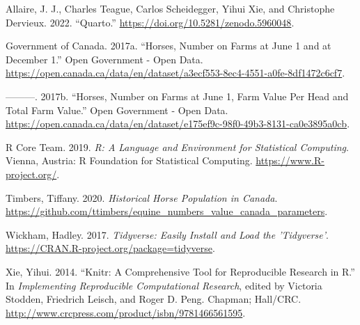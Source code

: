 \documentclass[
  letterpaper,
  DIV=11,
  numbers=noendperiod]{scrartcl}
\newlength{\cslhangindent}
\newenvironment{CSLReferences}[2] %
 {\begin{list}{}{%
  \setlength{\itemindent}{0pt}
  \setlength{\leftmargin}{0pt}
  \setlength{\parsep}{0pt}
  \ifodd #1
   \setlength{\leftmargin}{\cslhangindent}
   \setlength{\itemindent}{-1\cslhangindent}
  \fi
  \setlength{\itemsep}{#2\baselineskip}}}
 {\end{list}}
\begin{document}
\label{refs}
\begin{CSLReferences}{1}{0}
Allaire, J. J., Charles Teague, Carlos Scheidegger, Yihui Xie, and
Christophe Dervieux. 2022. {``{Quarto}.''}
\url{https://doi.org/10.5281/zenodo.5960048}.

Government of Canada. 2017a. {``Horses, Number on Farms at June 1 and at
December 1.''} Open Government - Open Data.
\url{https://open.canada.ca/data/en/dataset/a3ecf553-8ec4-4551-a0fe-8df1472c6cf7}.

---------. 2017b. {``Horses, Number on Farms at June 1, Farm Value Per
Head and Total Farm Value.''} Open Government - Open Data.
\url{https://open.canada.ca/data/en/dataset/e175ef9c-98f0-49b3-8131-ca0e3895a0cb}.

R Core Team. 2019. \emph{R: A Language and Environment for Statistical
Computing}. Vienna, Austria: R Foundation for Statistical Computing.
\url{https://www.R-project.org/}.

Timbers, Tiffany. 2020. \emph{Historical Horse Population in Canada}.
\url{https://github.com/ttimbers/equine_numbers_value_canada_parameters}.

Wickham, Hadley. 2017. \emph{Tidyverse: Easily Install and Load the
'Tidyverse'}. \url{https://CRAN.R-project.org/package=tidyverse}.

Xie, Yihui. 2014. {``Knitr: A Comprehensive Tool for Reproducible
Research in {R}.''} In \emph{Implementing Reproducible Computational
Research}, edited by Victoria Stodden, Friedrich Leisch, and Roger D.
Peng. Chapman; Hall/CRC.
\url{http://www.crcpress.com/product/isbn/9781466561595}.

\end{CSLReferences}
\end{document}

